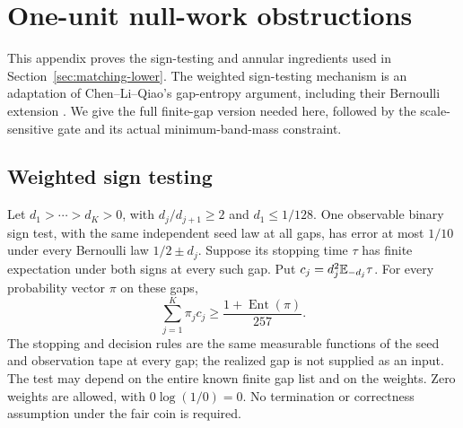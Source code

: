 \section{One-unit null-work obstructions}\label{sec:lower-foundations}

This appendix proves the sign-testing and annular ingredients used in
Section~\ref{sec:matching-lower}. The weighted sign-testing mechanism is
an adaptation of Chen--Li--Qiao's gap-entropy argument, including their
Bernoulli extension \cite[Lemma 4.1 and Remark D.4]{clq}. We give the full
finite-gap version needed here, followed by the scale-sensitive gate and
its actual minimum-band-mass constraint.

\subsection{Weighted sign testing}

\begin{lemma}\label{lem:weighted-sign}
Let $d_1>\cdots>d_K>0$, with $d_j/d_{j+1}\ge2$ and $d_1\le1/128$.
One observable binary sign test, with the same independent seed law at all
gaps, has error at most $1/10$ under every Bernoulli law $1/2\pm d_j$.
Suppose its stopping time $\tau$ has finite expectation under both signs at
every such gap.  Put $c_j=d_j^2\mathbb E_{-d_j}\tau$.
For every probability vector $\pi$ on these gaps,
\begin{equation}\label{eq:sc-weighted-sign}
 \sum_{j=1}^K\pi_jc_j\ge
 \frac{1+\operatorname{Ent}(\pi)}{257}.
\end{equation}
The stopping and decision rules are the same measurable functions of the
seed and observation tape at every gap; the realized gap is not supplied
as an input. The test may depend on the entire known finite gap list and
on the weights. Zero weights are allowed, with $0\log(1/0)=0$.
No termination or correctness assumption under the fair coin is required.
\end{lemma}

